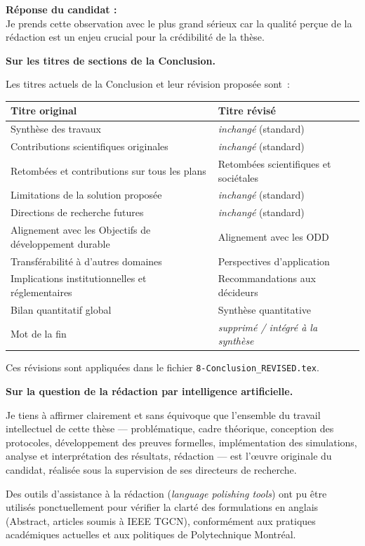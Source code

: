 \documentclass[12pt,a4paper]{article}
\newcommand{\Reponse}[1]{%
  \begin{responsebox}
    \textbf{Réponse du candidat :}\\#1
  \end{responsebox}%
}
\begin{document}
\Reponse{
Je prends cette observation avec le plus grand sérieux car la qualité perçue de la rédaction est un enjeu crucial pour la crédibilité de la thèse.

\textbf{Sur les titres de sections de la Conclusion.}

Les titres actuels de la Conclusion et leur révision proposée sont~:

\begin{center}
\small
\begin{tabular}{p{6cm} p{6cm}}
\toprule
\textbf{Titre original} & \textbf{Titre révisé} \\
\midrule
Synthèse des travaux & \textit{inchangé} (standard) \\
Contributions scientifiques originales & \textit{inchangé} (standard) \\
Retombées et contributions sur tous les plans & Retombées scientifiques et sociétales \\
Limitations de la solution proposée & \textit{inchangé} (standard) \\
Directions de recherche futures & \textit{inchangé} (standard) \\
Alignement avec les Objectifs de développement durable & Alignement avec les ODD \\
Transférabilité à d'autres domaines & Perspectives d'application \\
Implications institutionnelles et réglementaires & Recommandations aux décideurs \\
Bilan quantitatif global & Synthèse quantitative \\
Mot de la fin & \textit{supprimé / intégré à la synthèse} \\
\bottomrule
\end{tabular}
\end{center}

Ces révisions sont appliquées dans le fichier \texttt{8-Conclusion\_REVISED.tex}.

\textbf{Sur la question de la rédaction par intelligence artificielle.}

Je tiens à affirmer clairement et sans équivoque que l'ensemble du travail intellectuel de cette thèse --- problématique, cadre théorique, conception des protocoles, développement des preuves formelles, implémentation des simulations, analyse et interprétation des résultats, rédaction --- est l'œuvre originale du candidat, réalisée sous la supervision de ses directeurs de recherche.

Des outils d'assistance à la rédaction (\emph{language polishing tools}) ont pu être utilisés ponctuellement pour vérifier la clarté des formulations en anglais (Abstract, articles soumis à IEEE TGCN), conformément aux pratiques académiques actuelles et aux politiques de Polytechnique Montréal.

}
\end{document}
